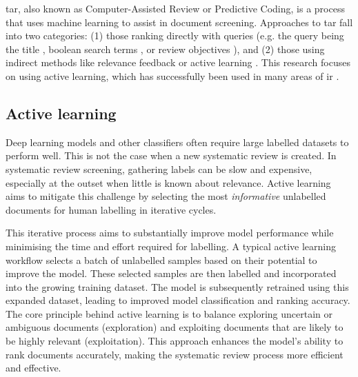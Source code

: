 \documentclass[10pt,oneside]{book}
\begin{document}
\gls*{tar}, also known as Computer-Assisted Review or Predictive Coding, is a process that uses machine learning to assist in document screening. Approaches to \gls*{tar} fall into two categories: (1) those ranking directly with queries (e.g. the query being the title \cite{alharbi_ranking_2017, alharbi_retrieving_2018}, boolean search terms  \cite{alharbi_ranking_2017, alharbi_retrieving_2018, alharbi_ranking_2019}, or review objectives \cite{ferro_qut_2017, scells_integrating_2017}), and (2) those using indirect methods like relevance feedback \cite{alharbi_ranking_2019} or active learning \cite{cormack_technology-assisted_2017, cormack_systems_2019, grossman_technology-assisted_2010, grossman_automatic_2017}. This research focuses on using active learning, which has successfully been used in many areas of \gls*{ir} \cite{cormack_autonomy_2015, cormack_engineering_2016, yu_fast2_2019, yu_finding_2018, miwa_reducing_2014}.

\subsection{Active learning}

Deep learning models and other classifiers often require large labelled datasets to perform well. This is not the case when a new systematic review is created. In systematic review screening, gathering labels can be slow and expensive, especially at the outset when little is known about relevance. Active learning aims to mitigate this challenge by selecting the most \emph{informative} unlabelled documents for human labelling in iterative cycles.

This iterative process aims to substantially improve model performance while minimising the time and effort required for labelling. A typical active learning workflow selects a batch of unlabelled samples based on their potential to improve the model. These selected samples are then labelled and incorporated into the growing training dataset. The model is subsequently retrained using this expanded dataset, leading to improved model classification and ranking accuracy. The core principle behind active learning is to balance exploring uncertain or ambiguous documents (exploration) and exploiting documents that are likely to be highly relevant (exploitation). This approach enhances the model's ability to rank documents accurately, making the systematic review process more efficient and effective.
\end{document}
